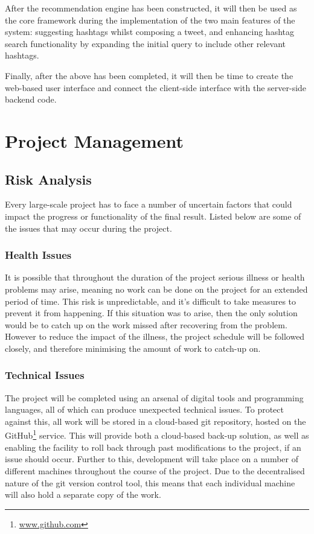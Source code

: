 \documentclass[12pt,a4paper]{article}
\begin{document}
After the recommendation engine has been constructed, it will then be used as the core framework during the implementation of the two main features of the system: suggesting hashtags whilst composing a tweet, and enhancing hashtag search functionality by expanding the initial query to include other relevant hashtags.

Finally, after the above has been completed, it will then be time to create the web-based user interface and connect the client-side interface with the server-side backend code.

\pagebreak

\section{Project Management}
\subsection{Risk Analysis}
Every large-scale project has to face a number of uncertain factors that could impact the progress or functionality of the final result. Listed below are some of the issues that may occur during the project.

\subsubsection{Health Issues}
It is possible that throughout the duration of the project serious illness or health problems may arise, meaning no work can be done on the project for an extended period of time. This risk is unpredictable, and it's difficult to take measures to prevent it from happening. If this situation was to arise, then the only solution would be to catch up on the work missed after recovering from the problem. However to reduce the impact of the illness, the project schedule will be followed closely, and therefore minimising the amount of work to catch-up on.

\subsubsection{Technical Issues}
The project will be completed using an arsenal of digital tools and programming languages, all of which can produce unexpected technical issues. To protect against this, all work will be stored in a cloud-based git repository, hosted on the GitHub\footnote{\url{www.github.com}} service. This will provide both a cloud-based back-up solution, as well as enabling the facility to roll back through past modifications to the project, if an issue should occur. Further to this, development will take place on a number of different machines throughout the course of the project. Due to the decentralised nature of the git version control tool, this means that each individual machine will also hold a separate copy of the work.
\end{document}

